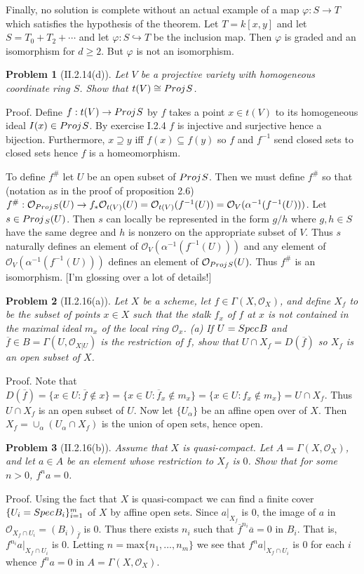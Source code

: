 \documentclass[12pt]{article}
\newcommand{\so}{\mathcal{O}}
\newtheorem{prob}{Problem}
\newcommand{\fh}{f^{\#}}
\newcommand{\proj}{Proj \hspace{.01in}}
\newcommand{\spec}{Spec \hspace{.01in}}
\newcommand{\proof}{\mbox{\sc Proof.\hspace{.1in}}}
\begin{document}
Finally, no solution is complete without an actual example of a
map $\varphi:S\rightarrow{}T$ which satisfies the hypothesis
of the theorem. Let $T=k[x,y]$ and let $S=T_0 + T_2 + \cdots$ and
let $\varphi:S\hookrightarrow T$ be the inclusion map. Then 
$\varphi$ is graded and an isomorphism for $d\geq 2$. But $\varphi$
is not an isomorphism.

\begin{prob}[II.2.14(d)] 
Let $V$ be a projective variety with homogeneous coordinate
ring $S$. Show that $t(V)\cong \proj S$. 
\end{prob}
\proof
Define $f:t(V)\rightarrow\proj S$ by $f$ takes a point
$x\in t(V)$ to its homogeneous ideal $I(x) \in \proj S$.  
By exercise I.2.4 $f$ is injective and surjective hence a
bijection. Furthermore, $x\supseteq{}y$ iff $f(x)\subseteq{}f(y)$
so $f$ and $f^{-1}$ send closed sets to closed sets hence
$f$ is a homeomorphism. 

To define $\fh$ let $U$ be an open subset of $\proj S$. Then we
must define $\fh$ so that (notation as in the proof of
proposition 2.6)
$\fh:\so_{\proj S}(U)\rightarrow f_{*}\so_{t(V)}(U)
=\so_{t(V)}(f^{-1}(U))=\so_V(\alpha^{-1}(f^{-1}(U)))$.
Let $s\in\proj_S(U)$. Then $s$ can locally be represented
in the form $g/h$ where $g,h \in S$ have the same degree and
$h$ is nonzero on the appropriate subset of $V$. Thus
$s$ naturally defines an element of $\so_V(\alpha^{-1}(f^{-1}(U)))$ 
and any element of $\so_V(\alpha^{-1}(f^{-1}(U)))$ defines an
element of $\so_{\proj S}(U).$ Thus $\fh$ is an isomorphism. 
[I'm glossing over a lot of details!] 
 
\begin{prob}[II.2.16(a)]
Let $X$ be a scheme, let $f\in\Gamma(X,\so_X)$, and define $X_f$ to
be the subset of points $x\in{}X$ such that the stalk $f_x$ of $f$
at $x$ is not contained in the maximal ideal $m_x$ of the local
ring $\so_x$. (a) If $U=\spec B$ and 
$\overline{f}\in{}B=\Gamma(U,\so_{X|U})$ is the restriction of $f$,
show that $U\cap{}X_f=D(\overline{f})$ so $X_f$ is an open subset
of $X$.  
\end{prob}
\proof
Note that $D(\overline{f})=\{x\in U:\overline{f}\notin x\}
=\{x\in U:\overline{f}_x\notin m_x\}
=\{x\in U:f_x\notin m_x\}
=U\cap{}X_f$. 
Thus $U\cap{}X_f$ is an open subset of $U$. Now let 
$\{U_{\alpha}\}$ be an affine open over of $X$. Then
$X_f=\cup_{\alpha}(U_\alpha \cap X_f)$ is the union
of open sets, hence open.

\begin{prob}[II.2.16(b)]
Assume that $X$ is quasi-compact. Let $A=\Gamma(X,\so_X)$, and let
$a\in A$ be an element whose restriction to $X_f$ is $0$. Show that 
for some $n>0$, $f^na=0$.
\end{prob}
\proof
Using the fact that $X$ is quasi-compact we can find a finite cover
$\{U_i=\spec B_i\}_{i=1}^m$ of $X$ by affine open sets. Since $a|_{X_f}$
is $0$, the image of $a$ in $\so_{X_f\cap{}U_i}=(B_i)_{\overline{f}}$
is 0. Thus there exists $n_i$ such that $\overline{f}^{n_i}\overline{a}=0$
in $B_i$. That is, $f^{n_i}a|_{X_f\cap{}U_i}$ is $0$. Letting 
$n=\mbox{max}\{n_1,\ldots,n_m\}$ we see that $f^n a|_{X_f\cap{}U_i}$ is $0$ for
each $i$ whence $f^n a=0$ in $A=\Gamma(X,\so_X)$.
\end{document}
